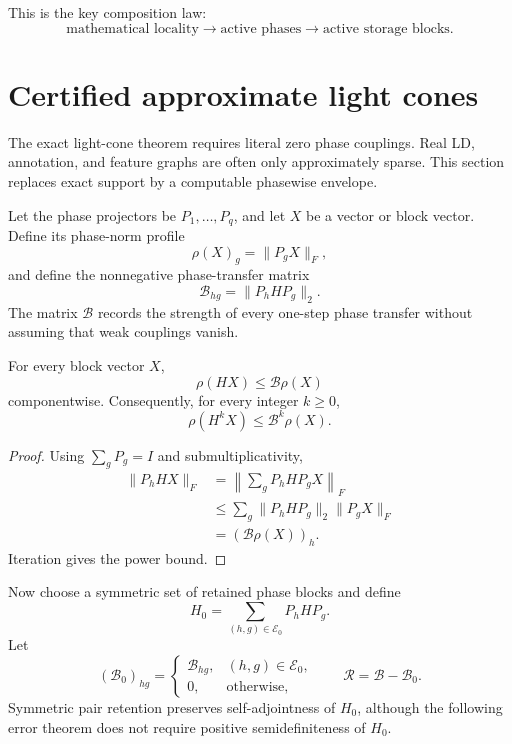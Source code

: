 This is the key composition law:
\[
\boxed{
\text{mathematical locality}
\longrightarrow
\text{active phases}
\longrightarrow
\text{active storage blocks}.
}
\]


\section{Certified approximate light cones}\label{sec:final-15}
\label{sec:approx-lightcone}

The exact light-cone theorem requires literal zero phase couplings.  Real LD,
annotation, and feature graphs are often only approximately sparse.  This
section replaces exact support by a computable phasewise envelope.

Let the phase projectors be $P_1,\ldots,P_q$, and let $X$ be a vector or block
vector.  Define its phase-norm profile
\[
\rho(X)_g=\lVert P_gX\rVert_F,
\]
and define the nonnegative phase-transfer matrix
\[
\mathcal B_{hg}=\lVert P_hHP_g\rVert_2.
\]
The matrix $\mathcal B$ records the strength of every one-step phase transfer
without assuming that weak couplings vanish.

\begin{theorem}
\label{thm:weighted-transfer}
For every block vector $X$,
\[
\boxed{
\rho(HX)\leq \mathcal B\rho(X)
}
\]
componentwise.  Consequently, for every integer $k\geq0$,
\[
\boxed{
\rho(H^kX)\leq \mathcal B^k\rho(X).
}
\]
\end{theorem}

\begin{proof}
Using $\sum_gP_g=I$ and submultiplicativity,
\[
\begin{aligned}
\lVert P_hHX\rVert_F
&=\left\lVert\sum_gP_hHP_gX\right\rVert_F\\
&\leq\sum_g\lVert P_hHP_g\rVert_2\lVert P_gX\rVert_F\\
&=(\mathcal B\rho(X))_h.
\end{aligned}
\]
Iteration gives the power bound.
\end{proof}

Now choose a symmetric set of retained phase blocks and define
\[
H_0=\sum_{(h,g)\in\mathcal E_0}P_hHP_g.
\]
Let
\[
(\mathcal B_0)_{hg}=
\begin{cases}
\mathcal B_{hg},&(h,g)\in\mathcal E_0,\\
0,&\text{otherwise},
\end{cases}
\qquad
\mathcal R=\mathcal B-\mathcal B_0.
\]
Symmetric pair retention preserves self-adjointness of $H_0$, although the
following error theorem does not require positive semidefiniteness of $H_0$.

